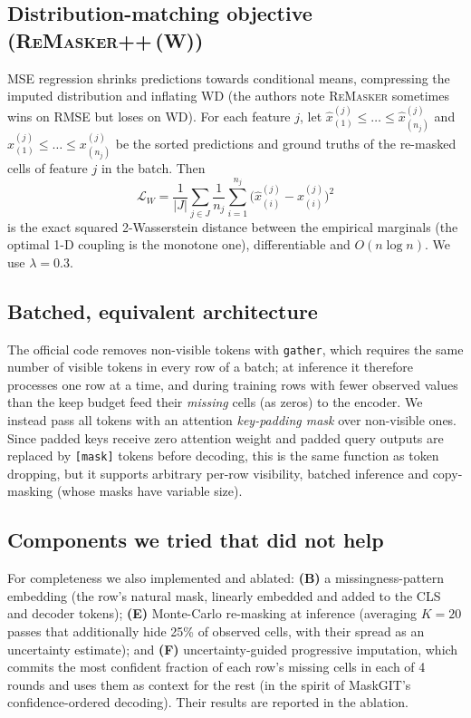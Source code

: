 \documentclass[11pt]{article}
\newcommand{\rmpp}{\textsc{ReMasker++}}
\newcommand{\remasker}{\textsc{ReMasker}}
\begin{document}
\subsection{Distribution-matching objective (\rmpp{}\,(W))}
MSE regression shrinks predictions towards conditional means, compressing the imputed distribution and inflating WD (the authors note \remasker{} sometimes wins on RMSE but loses on WD). For each feature $j$, let $\hat x^{(j)}_{(1)}\le\dots\le\hat x^{(j)}_{(n_j)}$ and $x^{(j)}_{(1)}\le\dots\le x^{(j)}_{(n_j)}$ be the sorted predictions and ground truths of the re-masked cells of feature $j$ in the batch. Then
\[
\mathcal{L}_W=\frac{1}{|J|}\sum_{j\in J}\frac{1}{n_j}\sum_{i=1}^{n_j}\big(\hat x^{(j)}_{(i)}-x^{(j)}_{(i)}\big)^2
\]
is the exact squared 2-Wasserstein distance between the empirical marginals (the optimal 1-D coupling is the monotone one), differentiable and $O(n\log n)$. We use $\lambda=0.3$.

\subsection{Batched, equivalent architecture}
The official code removes non-visible tokens with \texttt{gather}, which requires the same number of visible tokens in every row of a batch; at inference it therefore processes one row at a time, and during training rows with fewer observed values than the keep budget feed their \emph{missing} cells (as zeros) to the encoder. We instead pass all tokens with an attention \emph{key-padding mask} over non-visible ones. Since padded keys receive zero attention weight and padded query outputs are replaced by \texttt{[mask]} tokens before decoding, this is the same function as token dropping, but it supports arbitrary per-row visibility, batched inference and copy-masking (whose masks have variable size).

\subsection{Components we tried that did not help}
For completeness we also implemented and ablated: \textbf{(B)} a missingness-pattern embedding (the row's natural mask, linearly embedded and added to the CLS and decoder tokens); \textbf{(E)} Monte-Carlo re-masking at inference (averaging $K=20$ passes that additionally hide 25\% of observed cells, with their spread as an uncertainty estimate); and \textbf{(F)} uncertainty-guided progressive imputation, which commits the most confident fraction of each row's missing cells in each of 4 rounds and uses them as context for the rest (in the spirit of MaskGIT's confidence-ordered decoding). Their results are reported in the ablation.
\end{document}
